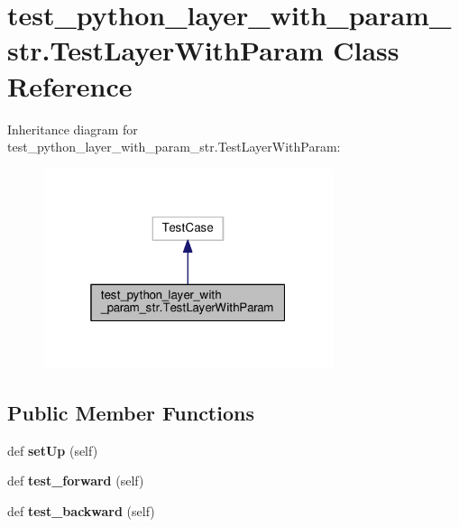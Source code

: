 \hypertarget{classtest__python__layer__with__param__str_1_1_test_layer_with_param}{}\section{test\+\_\+python\+\_\+layer\+\_\+with\+\_\+param\+\_\+str.\+Test\+Layer\+With\+Param Class Reference}
\label{classtest__python__layer__with__param__str_1_1_test_layer_with_param}


Inheritance diagram for test\+\_\+python\+\_\+layer\+\_\+with\+\_\+param\+\_\+str.\+Test\+Layer\+With\+Param\+:
\nopagebreak
\begin{figure}[H]
\begin{center}
\leavevmode
\includegraphics[width=241pt]{classtest__python__layer__with__param__str_1_1_test_layer_with_param__inherit__graph}
\end{center}
\end{figure}
\subsection*{Public Member Functions}
\begin{DoxyCompactItemize}
\item 
\mbox{\label{classtest__python__layer__with__param__str_1_1_test_layer_with_param_a5fa0aa5a6500d42e907c878e278ee1e4}} 
def {\bfseries set\+Up} (self)
\item 
\mbox{\label{classtest__python__layer__with__param__str_1_1_test_layer_with_param_a9c9a33c6b91427dad9aba50652d26d00}} 
def {\bfseries test\+\_\+forward} (self)
\item 
\mbox{\label{classtest__python__layer__with__param__str_1_1_test_layer_with_param_ac9fe8dc5c71c676e225c37f12ec6a605}} 
def {\bfseries test\+\_\+backward} (self)
\end{DoxyCompactItemize}
